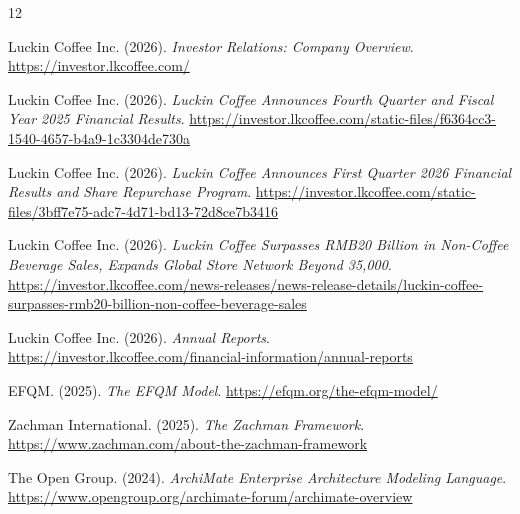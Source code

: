 \documentclass[12pt,a4paper]{article}
\begin{document}
\begingroup
\small
\begin{thebibliography}{12}

Luckin Coffee Inc. (2026).
\emph{Investor Relations: Company Overview}.
\url{https://investor.lkcoffee.com/}

Luckin Coffee Inc. (2026).
\emph{Luckin Coffee Announces Fourth Quarter and Fiscal Year 2025 Financial Results}.
\url{https://investor.lkcoffee.com/static-files/f6364cc3-1540-4657-b4a9-1c3304de730a}

Luckin Coffee Inc. (2026).
\emph{Luckin Coffee Announces First Quarter 2026 Financial Results and Share Repurchase Program}.
\url{https://investor.lkcoffee.com/static-files/3bff7e75-adc7-4d71-bd13-72d8ce7b3416}

Luckin Coffee Inc. (2026).
\emph{Luckin Coffee Surpasses RMB20 Billion in Non-Coffee Beverage Sales, Expands Global Store Network Beyond 35,000}.
\url{https://investor.lkcoffee.com/news-releases/news-release-details/luckin-coffee-surpasses-rmb20-billion-non-coffee-beverage-sales}

Luckin Coffee Inc. (2026).
\emph{Annual Reports}.
\url{https://investor.lkcoffee.com/financial-information/annual-reports}

EFQM. (2025).
\emph{The EFQM Model}.
\url{https://efqm.org/the-efqm-model/}

Zachman International. (2025).
\emph{The Zachman Framework}.
\url{https://www.zachman.com/about-the-zachman-framework}

The Open Group. (2024).
\emph{ArchiMate Enterprise Architecture Modeling Language}.
\url{https://www.opengroup.org/archimate-forum/archimate-overview}

\end{thebibliography}
\endgroup
\end{document}

